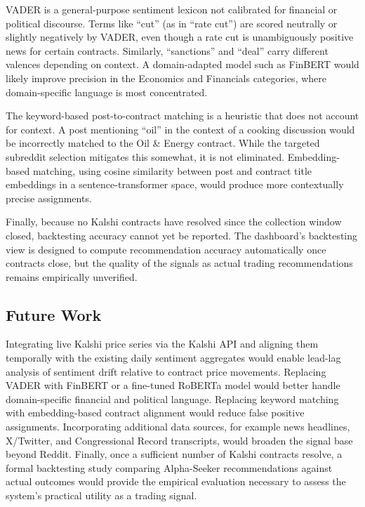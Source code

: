 \documentclass[sigconf]{acmart}
\begin{document}
VADER is a general-purpose sentiment lexicon not calibrated for financial or political discourse. Terms like ``cut'' (as in ``rate cut'') are scored neutrally or slightly negatively by VADER, even though a rate cut is unambiguously positive news for certain contracts. Similarly, ``sanctions'' and ``deal'' carry different valences depending on context. A domain-adapted model such as FinBERT \cite{araci2019finbert} would likely improve precision in the Economics and Financials categories, where domain-specific language is most concentrated.

The keyword-based post-to-contract matching is a heuristic that does not account for context. A post mentioning ``oil'' in the context of a cooking discussion would be incorrectly matched to the Oil \& Energy contract. While the targeted subreddit selection mitigates this somewhat, it is not eliminated. Embedding-based matching, using cosine similarity between post and contract title embeddings in a sentence-transformer space, would produce more contextually precise assignments.

Finally, because no Kalshi contracts have resolved since the collection window closed, backtesting accuracy cannot yet be reported. The dashboard's backtesting view is designed to compute recommendation accuracy automatically once contracts close, but the quality of the signals as actual trading recommendations remains empirically unverified.

\subsection{Future Work}

Integrating live Kalshi price series via the Kalshi API and aligning them temporally with the existing daily sentiment aggregates would enable lead-lag analysis of sentiment drift relative to contract price movements. Replacing VADER with FinBERT or a fine-tuned RoBERTa model would better handle domain-specific financial and political language. Replacing keyword matching with embedding-based contract alignment would reduce false positive assignments. Incorporating additional data sources, for example news headlines, X/Twitter, and Congressional Record transcripts, would broaden the signal base beyond Reddit. Finally, once a sufficient number of Kalshi contracts resolve, a formal backtesting study comparing Alpha-Seeker recommendations against actual outcomes would provide the empirical evaluation necessary to assess the system's practical utility as a trading signal.
\end{document}
